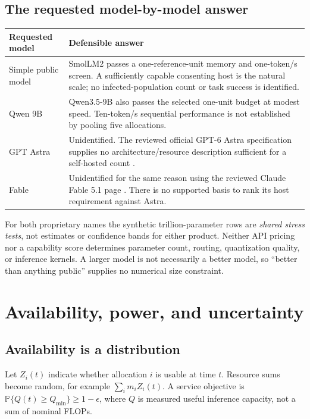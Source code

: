 \documentclass[11pt]{article}
\newcommand{\Prb}{\mathbb P}
\begin{document}
\subsection{The requested model-by-model answer}
\begin{table}[ht]
\centering\small
\begin{tabularx}{\textwidth}{lX}
\toprule Requested model & Defensible answer\\\midrule
Simple public model & SmolLM2 passes a one-reference-unit memory and one-token/s screen. A sufficiently capable consenting host is the natural scale; no infected-population count or task success is identified.\\
Qwen 9B & Qwen3.5-9B also passes the selected one-unit budget at modest speed. Ten-token/s sequential performance is not established by pooling five allocations.\\
GPT Astra & Unidentified. The reviewed official GPT-6 Astra specification supplies no architecture/resource description sufficient for a self-hosted count \citep{astra}.\\
Fable & Unidentified for the same reason using the reviewed Claude Fable 5.1 page \citep{fable}. There is no supported basis to rank its host requirement against Astra.\\\bottomrule
\end{tabularx}
\end{table}
For both proprietary names the synthetic trillion-parameter rows are \emph{shared stress tests}, not estimates or confidence bands for either product. Neither API pricing nor a capability score determines parameter count, routing, quantization quality, or inference kernels. A larger model is not necessarily a better model, so ``better than anything public'' supplies no numerical size constraint.

\section{Availability, power, and uncertainty}
\subsection{Availability is a distribution}
Let $Z_i(t)$ indicate whether allocation $i$ is usable at time $t$. Resource sums become random, for example $\sum_i m_iZ_i(t)$. A service objective is $\Prb\{Q(t)\ge Q_{\min}\}\ge1-\epsilon$, where $Q$ is measured useful inference capacity, not a sum of nominal FLOPs.
\end{document}
